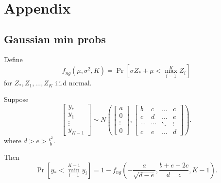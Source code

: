 \documentclass[12pt]{article}
\begin{document}
\section{Appendix}

\subsection{Gaussian min probs}

Define
\[
f_{ng}(\mu,\sigma^2, K) = \Pr[\sigma Z_* + \mu < \max_{i=1}^K Z_i]
\]
for $Z_*, Z_1,\hdots, Z_K$ i.i.d normal.

Suppose
\[
\begin{bmatrix}
y_* \\
y_1 \\
\vdots \\
y_{K-1}
\end{bmatrix}
\sim
N\left(
\begin{bmatrix}
a\\
0\\
\vdots \\
0
\end{bmatrix},
\begin{bmatrix}
b & c & \hdots & c\\
c & d & \hdots & e\\
\cdots & \cdots & \ddots & \vdots\\
c & e & \hdots & d
\end{bmatrix}
\right).
\]
where $d > e > \frac{c^2}{b}$.

Then
\[
\Pr[y_* < \min_{i=1}^{K-1} y_i] = 1- f_{ng}\left(-\frac{a}{\sqrt{d-e}}, \frac{b + e- 2c}{d-e},K-1\right).
\]
\end{document}
